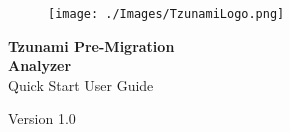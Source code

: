 \pagestyle{empty}
\begin{figure}[tp] %
\texttt{[image: ./Images/TzunamiLogo.png]}
\end{figure}
\begin{flushright}  
	\vspace*{\fill}
	 \textcolor{coverTextColor}{\huge \textbf{Tzunami Pre-Migration}}\\
	 \textcolor{coverTextColor}{\huge \textbf{{Analyzer}\\}}  
	Quick Start User Guide
	\vspace*{\fill}
\par

\end{flushright}
\begin{center} 
{\Large\vspace*{2mm} \par\vspace*{4mm} \vspace*{3mm}\large Version 1.0}\par
\end{center} 
 